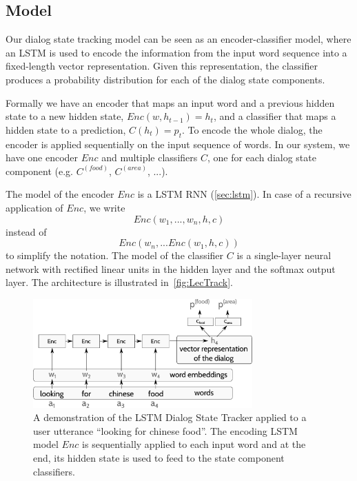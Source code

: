\documentclass[runningheads,a4paper]{llncs}
\begin{document}
\subsection{Model}
Our dialog state tracking model can be seen as an encoder-classifier model, where an LSTM is used to encode the information from the input word sequence into a fixed-length vector representation. Given this representation, the classifier produces a probability distribution for each of the dialog state components.

Formally we have an encoder that maps an input word and a previous hidden state to a new hidden state, $Enc(w, h_{t-1})=h_t$, and a classifier that maps a hidden state to a prediction, $C(h_t)=p_t$. To encode the whole dialog, the encoder is applied sequentially on the input sequence of words. In our system, we have one encoder $Enc$ and multiple classifiers $C$, one for each dialog state component (e.g. $C^{(food)}$, $C^{(area)}$, ...).

The model of the encoder $Enc$ is a LSTM RNN (\autoref{sec:lstm}). In case of a recursive application of $Enc$, we write
\begin{equation}Enc(w_1, ..., w_n, h, c)\end{equation} instead of
\begin{equation}Enc(w_n, ... Enc(w_1, h, c))\end{equation} to simplify the notation. The model of the classifier $C$ is a single-layer neural network with rectified linear units in the hidden layer and the softmax output layer. The architecture is illustrated in~\autoref{fig:LecTrack}.

\begin{figure}
\center
\includegraphics[width=0.75\textwidth]{arch}
\caption{A demonstration of the LSTM Dialog State Tracker applied to a user utterance ``looking for chinese food''. The encoding LSTM model $Enc$ is sequentially applied to each input word and at the end, its hidden state is used to feed to the state component classifiers.}
\label{fig:LecTrack}
\end{figure}
\end{document}
